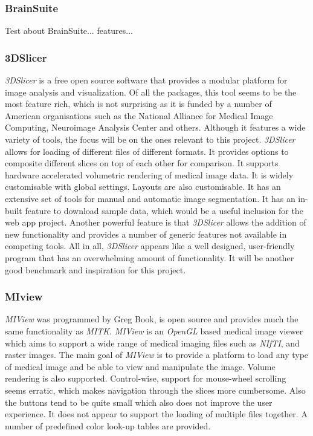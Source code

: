 \documentclass[a4paper,11pt,titlepage]{article}
\begin{document}
\subsubsection{BrainSuite}

Test about BrainSuite... features...


\subsubsection{3DSlicer}
\textit{3DSlicer} is a free open source software that provides a modular platform for image analysis and visualization. Of all the packages, this tool seems to be the most feature rich, which is not surprising as it is funded by a number of American organisations such as  the National Alliance for Medical Image Computing, Neuroimage Analysis Center and others. Although it features a wide variety of tools, the focus will be on the ones relevant to this project. \textit{3DSlicer} allows for loading of different files of different formats. It provides options to composite different slices on top of each other for comparison. It supports hardware accelerated volumetric rendering of medical image data. It is widely customisable with global settings. Layouts are also customisable. It has an extensive set of tools for manual and automatic image segmentation. It has an in-built feature to download sample data, which would be a useful inclusion for the web app project. Another powerful feature is that \textit{3DSlicer} allows the addition of new functionality and provides a number of generic features not available in competing tools. All in all, \textit{3DSlicer} appears like a well designed, user-friendly program that has an overwhelming amount of functionality. It will be another good benchmark and inspiration for this project.

\subsubsection{MIview}
\textit{MIView} was programmed by Greg Book, is open source and provides much the same functionality as \textit{MITK}. \textit{MIView} is an \textit{OpenGL} based medical image viewer which aims to support a wide range of medical imaging files such as \textit{NIfTI}, and raster images. The main goal of \textit{MIView} is to provide a platform to load any type of medical image and be able to view and manipulate the image. Volume rendering is also supported. Control-wise, support for mouse-wheel scrolling seems erratic, which makes navigation through the slices more cumbersome. Also the buttons tend to be quite small which also does not improve the user experience. It does not appear to support the loading of multiple files together. A number of predefined color look-up tables are provided.
\end{document}
